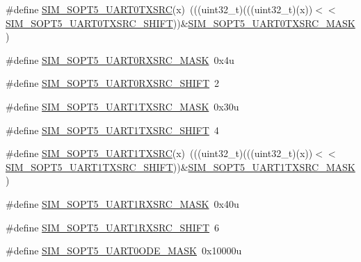 \begin{DoxyCompactItemize}
\item 
\#define \hyperlink{group___s_i_m___register___masks_ga65e932e39703b2b18dea82ca440fc68f}{S\+I\+M\+\_\+\+S\+O\+P\+T5\+\_\+\+U\+A\+R\+T0\+T\+X\+S\+RC}(x)~(((uint32\+\_\+t)(((uint32\+\_\+t)(x))$<$$<$\hyperlink{group___s_i_m___register___masks_ga0220b88df4a0747579d24b77f4db4e67}{S\+I\+M\+\_\+\+S\+O\+P\+T5\+\_\+\+U\+A\+R\+T0\+T\+X\+S\+R\+C\+\_\+\+S\+H\+I\+FT}))\&\hyperlink{group___s_i_m___register___masks_ga11646c1292cb7aab3128e1e563847e32}{S\+I\+M\+\_\+\+S\+O\+P\+T5\+\_\+\+U\+A\+R\+T0\+T\+X\+S\+R\+C\+\_\+\+M\+A\+SK})
\item 
\#define \hyperlink{group___s_i_m___register___masks_ga6160de3cd4b7169ac9095c0d0eee46f7}{S\+I\+M\+\_\+\+S\+O\+P\+T5\+\_\+\+U\+A\+R\+T0\+R\+X\+S\+R\+C\+\_\+\+M\+A\+SK}~0x4u
\item 
\#define \hyperlink{group___s_i_m___register___masks_ga27e87f2f792b880bd156907ab20e9910}{S\+I\+M\+\_\+\+S\+O\+P\+T5\+\_\+\+U\+A\+R\+T0\+R\+X\+S\+R\+C\+\_\+\+S\+H\+I\+FT}~2
\item 
\#define \hyperlink{group___s_i_m___register___masks_gac473b632c382f785d524c177ff186e0d}{S\+I\+M\+\_\+\+S\+O\+P\+T5\+\_\+\+U\+A\+R\+T1\+T\+X\+S\+R\+C\+\_\+\+M\+A\+SK}~0x30u
\item 
\#define \hyperlink{group___s_i_m___register___masks_ga7714c11e5536dacc90fbc2960e532e94}{S\+I\+M\+\_\+\+S\+O\+P\+T5\+\_\+\+U\+A\+R\+T1\+T\+X\+S\+R\+C\+\_\+\+S\+H\+I\+FT}~4
\item 
\#define \hyperlink{group___s_i_m___register___masks_ga78611068b87a39563cd065ff840e3c68}{S\+I\+M\+\_\+\+S\+O\+P\+T5\+\_\+\+U\+A\+R\+T1\+T\+X\+S\+RC}(x)~(((uint32\+\_\+t)(((uint32\+\_\+t)(x))$<$$<$\hyperlink{group___s_i_m___register___masks_ga7714c11e5536dacc90fbc2960e532e94}{S\+I\+M\+\_\+\+S\+O\+P\+T5\+\_\+\+U\+A\+R\+T1\+T\+X\+S\+R\+C\+\_\+\+S\+H\+I\+FT}))\&\hyperlink{group___s_i_m___register___masks_gac473b632c382f785d524c177ff186e0d}{S\+I\+M\+\_\+\+S\+O\+P\+T5\+\_\+\+U\+A\+R\+T1\+T\+X\+S\+R\+C\+\_\+\+M\+A\+SK})
\item 
\#define \hyperlink{group___s_i_m___register___masks_gaf34eb14baf5894693130af7addd8aa6f}{S\+I\+M\+\_\+\+S\+O\+P\+T5\+\_\+\+U\+A\+R\+T1\+R\+X\+S\+R\+C\+\_\+\+M\+A\+SK}~0x40u
\item 
\#define \hyperlink{group___s_i_m___register___masks_ga098fcb3123342f9cd96869c69d2fb7a9}{S\+I\+M\+\_\+\+S\+O\+P\+T5\+\_\+\+U\+A\+R\+T1\+R\+X\+S\+R\+C\+\_\+\+S\+H\+I\+FT}~6
\item 
\#define \hyperlink{group___s_i_m___register___masks_ga85d9af0e8b110779992162a6820b5358}{S\+I\+M\+\_\+\+S\+O\+P\+T5\+\_\+\+U\+A\+R\+T0\+O\+D\+E\+\_\+\+M\+A\+SK}~0x10000u

\end{DoxyCompactItemize}
